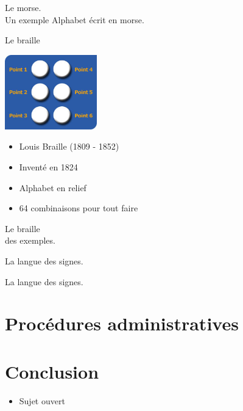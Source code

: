 \documentclass{beamer}
\begin{document}
\begin{frame}  
  \Huge Le morse.
  \\ \normalsize Un exemple Alphabet écrit en morse.
\end{frame}


\begin{frame}  
  \Huge{Le braille}
  \begin{center}
  \includegraphics[width=4cm]{./include/cellule_braille.jpg}
  \end{center}
  \normalsize \begin{itemize}
  \item Louis Braille (1809 - 1852)
  \item Inventé en 1824
  \item Alphabet en relief
  \item 64 combinaisons pour tout faire
  \end{itemize}
\end{frame}

\begin{frame}  
  \Huge Le braille
  \\ des exemples.
\end{frame}


\begin{frame}  
  \Huge La langue des signes.
\end{frame}

\begin{frame}  
  \Huge La langue des signes.
\end{frame}

\section{Procédures administratives}

\begin{frame}
\end{frame}

\section{Conclusion}

\begin{frame}
  \begin{itemize}
  \item Sujet ouvert%
  \end{itemize}
\end{frame}
\end{document}
